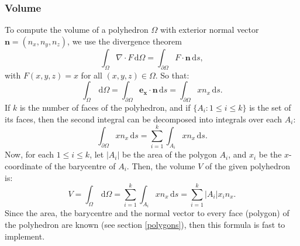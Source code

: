 \subsubsection{Volume}
To compute the volume of a polyhedron $\Omega$ with exterior normal vector $\mathbf{n}=(n_x,n_y,n_z)$, we use the divergence theorem
$$ \int_\Omega \nabla \cdot F \, \mathrm{d}\Omega=\int_{\partial\Omega}F \cdot\mathbf{n}
\, \mathrm{d}s, $$
with $F(x,y,z) = x$ for all $(x,y,z)\in \Omega$. So that:
$$
\int_\Omega \, \mathrm{d}\Omega=\int_{\partial\Omega} \mathbf{e_x} \cdot \mathbf{n} \, \mathrm{d}s =\int_{\partial\Omega} x  n_x \, \mathrm{d}s.
$$
If $k$ is the number of faces of the polyhedron, and if $\{A_i : 1\leq i\leq k\}$ is the set of its faces, then the second integral can be decomposed into integrals over each $A_i$:
$$ \int_{\partial\Omega} x n_x \, \mathrm{d}s=\sum_{i=1}^k \int_{A_i} x n_x \, \mathrm{d}s.$$
Now, for each $1\leq i\leq k$, let $|A_i|$ be the area of the polygon $A_i$, and $x_i$ be the $x$-coordinate of the barycentre of $A_i$. Then, the volume $V$ of the given polyhedron is:
$$
V = \int_\Omega \, \mathrm{d}\Omega = \sum_{i=1}^k \int_{A_i} x n_x \, \mathrm{d}s = \sum_{i=1}^k |A_i|x_in_x.
$$
Since the area, the barycentre and the normal vector to every face (polygon) of the polyhedron are known (see section \ref{polygons}), then this formula is fast to implement.

